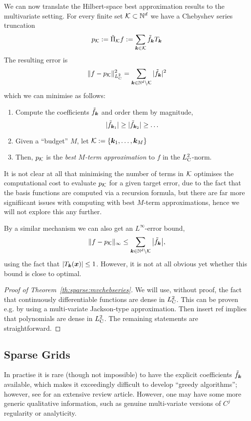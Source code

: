 We can now translate the  Hilbert-space best approximation results 
to the multivariate setting. For every finite set $\mathcal{K} \subset \mathbb{N}^d$
we have a Chebyshev series truncation 
\[
    p_{\mathcal{K}} := \tilde\Pi_{\mathcal{K}} f := \sum_{{\bm k} \in \mathcal{K}} \tilde{f}_{\bm k} T_{\bm k}
\]
The resulting error is 
\[
    \| f - p_{\mathcal{K}} \|_{L^2_{\rm C}}^2 
        = \sum_{{\bm k} \in \mathbb{N}^d \setminus \mathcal{K}} 
        |\tilde{f}_{\bm k}|^2
\]
which we can minimise as follows: 
\begin{enumerate}
\item Compute the coefficients $\tilde{f}_{\bm k}$ and order them by magnitude, 
\[ 
    |\tilde{f}_{{\bm k}_1}| \geq |\tilde{f}_{{\bm k}_2}| \geq \dots 
\] 
\item Given a ``budget'' $M$, let $\mathcal{K} := \{{\bm k}_1, \dots, {\bm k}_M\}$
\item Then, $p_{\mathcal{K}}$ is the {\em best $M$-term approximation} to $f$
        in the $L^2_{\rm C}$-norm.
\end{enumerate}

\begin{remark}
    It is not clear at all that minimising the number of terms in $\mathcal{K}$
    optimises the computational cost to evaluate $p_{\mathcal{K}}$ for a given target
    error, due to the fact that the basis functions are computed via a recursion
    formula, but there are far more signifiicant issues with computing with best
    $M$-term approximations, hence we will not explore this any further. 
\end{remark}

By a similar mechanism we can also get an $L^\infty$-error bound, 
\[
    \|f-p_{\mathcal{K}}\|_{\infty}  
    \leq \sum_{{\bm k} \in \mathbb{N}^d \setminus \mathcal{K}}
    \big|\tilde{f}_{\bm k}\big|,
\]
using the fact that $|T_{\bm k}({\bm x})| \leq 1$. However, it is not at all obvious yet
whether this bound is close to optimal.

\begin{proof}[Proof of Theorem~\ref{th:sparse:mvchebseries}] 
    We will use, without proof, the fact that continuously differentiable
    functions are dense in $L^2_{\rm C}$. This can be proven e.g. by using a
    multi-variate Jackson-type approximation. Then \alert{insert ref} 
    implies that polynomials are dense in $L^2_{\rm C}$. The remaining 
    statements are straightforward. 
\end{proof}



\subsection{Sparse Grids}
%
\label{sec:sparse:sparse}
%
In practise it is rare (though not impossible) to have the explicit coefficients
$\tilde{f}_{\bm k}$ available, which makes it exceedingly difficult to develop
``greedy algorithms''; however, see \cite{DeVore1998-do} for an extensive review
article. However, one may have some more generic qualitative information, 
such as genuine multi-variate versions of $C^j$ regularity or analyticity.

